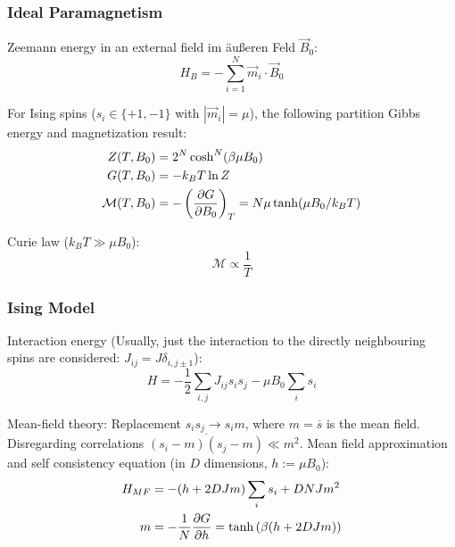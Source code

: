 		\subsubsection{Ideal Paramagnetism}
			\noindent
			Zeemann energy in an external field im äußeren Feld $\vec{B}_0$:
			\begin{equation}
				H_B = -\sum_{i=1}^N \vec{m}_i \cdot \vec{B}_0
			\end{equation}

			\noindent
			For Ising spins ($s_i\in\lbrace +1, -1\rbrace$ with $|\vec{m}_i| = \mu$), the following partition Gibbs energy and magnetization result:
			\begin{equation}
				\begin{aligned}
					Z(T,B_0) &= 2^N \cosh^N (\beta\mu B_0) \\
					G(T,B_0) &= -k_B T \ln Z \\
					\mathcal{M}(T,B_0) &= -\left(\frac{\partial G}{\partial B_0}\right)_T = N\mu \tanh(\mu B_0 /k_B T)
				\end{aligned}
			\end{equation}

			\noindent
			Curie law ($k_B T \gg \mu B_0$):
			\begin{equation}
				\mathcal{M} \propto \frac{1}{T}
			\end{equation}

		\subsubsection{Ising Model}
			\noindent
			Interaction energy (Usually, just the interaction to the directly neighbouring spins are considered: $J_{ij} = J \delta_{i,j\pm 1}$):
			\begin{equation}
				H = -\frac{1}{2}\sum_{i,j} J_{ij} s_i s_j -\mu B_0 \sum_i s_i
			\end{equation}

			\noindent
			Mean-field theory: \newline
			Replacement $s_i s_j \rightarrow s_i m$, where $m = \overline{s}$ is the mean field. Disregarding correlations $\overline{(s_i-m)(s_j-m)}\ll m^2$. \nl
			Mean field approximation and self consistency equation (in $D$ dimensions, $h:=\mu B_0$):
			\begin{equation}
				\begin{aligned}
					H_{MF} &= -(h + 2 D J m) \sum_i s_i + D N J m^2 \\
					m &= -\frac{1}{N}\frac{\partial G}{\partial h} = \tanh\left({\beta(h + 2 D J m)}\right)
				\end{aligned}
			\end{equation}
